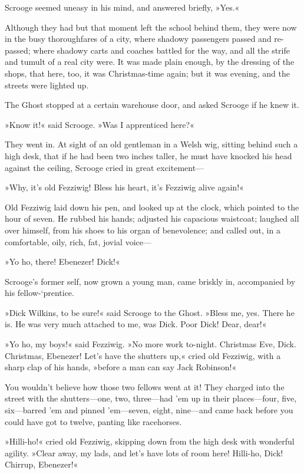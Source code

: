 Scrooge seemed uneasy in his mind, and answered briefly, »Yes.«

Although they had but that moment left the school behind them, they were now in the busy thoroughfares of a city, where shadowy passengers passed and re-passed; where shadowy carts and coaches battled for the way, and all the strife and tumult of a real city were. It was made plain enough, by the dressing of the shops, that here, too, it was Christmas-time again; but it was evening, and the streets were lighted up.

The Ghost stopped at a certain warehouse door, and asked Scrooge if he knew it.

»Know it!« said Scrooge. »Was I apprenticed here?«

They went in. At sight of an old gentleman in a Welsh wig, sitting behind such a high desk, that if he had been two inches taller, he must have knocked his head against the ceiling, Scrooge cried in great excitement--- 

»Why, it's old Fezziwig! Bless his heart, it's Fezziwig alive again!«

Old Fezziwig laid down his pen, and looked up at the clock, which pointed to the hour of seven. He rubbed his hands; adjusted his capacious waistcoat; laughed all over himself, from his shoes to his organ of benevolence; and called out, in a comfortable, oily, rich, fat, jovial voice--- 

»Yo ho, there! Ebenezer! Dick!«

Scrooge's former self, now grown a young man, came briskly in, accompanied by his fellow-`prentice.

»Dick Wilkins, to be sure!« said Scrooge to the Ghost. »Bless me, yes. There he is. He was very much attached to me, was Dick. Poor Dick! Dear, dear!«

»Yo ho, my boys!« said Fezziwig. »No more work to-night. Christmas Eve, Dick. Christmas, Ebenezer! Let's have the shutters up,« cried old Fezziwig, with a sharp clap of his hands, »before a man can say Jack Robinson!«

You wouldn't believe how those two fellows went at it! They charged into the street with the shutters---one, two, three---had 'em up in their places---four, five, six---barred 'em and pinned 'em---seven, eight, nine---and came back before you could have got to twelve, panting like racehorses.

»Hilli-ho!« cried old Fezziwig, skipping down from the high desk with wonderful agility. »Clear away, my lads, and let's have lots of room here! Hilli-ho, Dick! Chirrup, Ebenezer!«


